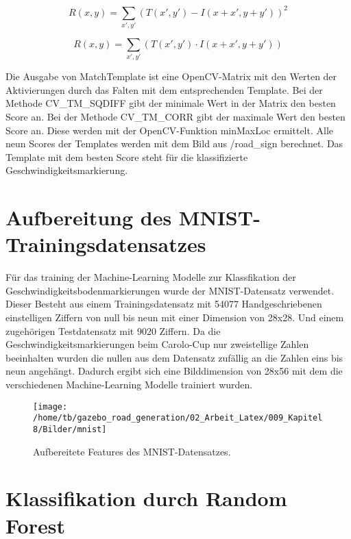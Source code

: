$$R(x,y) = \sum_{x',y'} (T(x',y')-I(x+x',y+y'))^2$$  

$$R(x,y) = \sum_{x',y'} (T(x',y') \cdot I(x+x',y+y'))$$  


Die Ausgabe von MatchTemplate ist eine OpenCV-Matrix mit den Werten der Aktivierungen durch das Falten mit dem entsprechenden Template.
Bei der Methode CV\_TM\_SQDIFF gibt der minimale Wert in der Matrix den besten Score an. Bei der Methode CV\_TM\_CORR gibt der maximale Wert den besten Score an. Diese werden mit der OpenCV-Funktion minMaxLoc ermittelt.
Alle neun Scores der Templates werden mit dem Bild aus /road\_sign berechnet.
Das Template mit dem besten Score steht f{\"u}r die klassifizierte Geschwindigkeitsmarkierung. 



\section{Aufbereitung des MNIST-Trainingsdatensatzes}
\label{sec:Aufbereitung des MNIST-Trainingsdatensatzes}

F{\"u}r das training der Machine-Learning Modelle zur Klassfikation der Geschwindigkeitsbodenmarkierungen wurde der MNIST-Datensatz verwendet.
Dieser Besteht aus einem Trainingsdatensatz mit 54077 Handgeschriebenen einstelligen Ziffern von null bis neun mit einer Dimension von 28x28. Und einem zugeh{\"o}rigen Testdatensatz mit 9020 Ziffern.
Da die Geschwindigkeitsmarkierungen beim Carolo-Cup nur zweistellige Zahlen beeinhalten wurden die nullen aus dem Datensatz zuf{\"a}llig an die Zahlen eins bis neun angeh{\"a}ngt. Dadurch ergibt sich eine Bilddimension von 28x56 mit dem die verschiedenen Machine-Learning Modelle trainiert wurden.

\begin{figure}[H]
\begin{center}
  \texttt{[image: /home/tb/gazebo\_road\_generation/02\_Arbeit\_Latex/009\_Kapitel8/Bilder/mnist]}%
  \caption[Aufbereitete Features des MNIST-Datensatzes]%
           {\label{fig:Aufbereitete Features des MNIST-Datensatzes}%
           Aufbereitete Features des MNIST-Datensatzes.
           }
\end{center}
\end{figure}

\section{Klassifikation durch Random Forest}
\label{sec:Klassifikation durch Random Forest}

